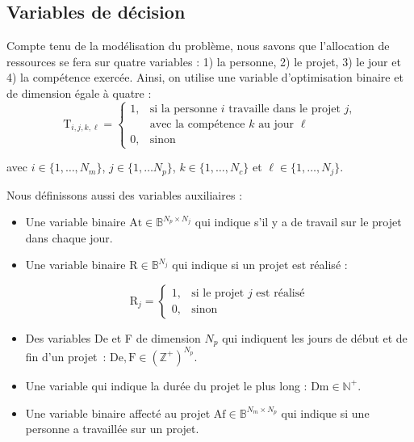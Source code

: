 \documentclass[12pt, a4paper, english, version=last, parskip=half, titlepage]{scrartcl}
\begin{document}
\subsection{Variables de décision}

Compte tenu de la modélisation du problème, nous savons que l'allocation de ressources se fera sur quatre variables : 1) la personne, 2) le projet, 3) le jour et 4) la compétence exercée. Ainsi, on utilise une variable d'optimisation binaire et de dimension égale à quatre :
\begin{equation*}
    \text{T}_{i,j,k,\ell} = 
    \begin{cases}
        1, & \text{si la personne $i$ travaille dans le projet $j$,} \\[-0.1em]
           & \text{avec la compétence $k$ au jour $\ell$} \\[0.2em]
        0, & \text{sinon}
    \end{cases}
\end{equation*}

avec $i \in \{1, \dots, N_m\}$, $j \in \{1, \dots N_p\}$, $k \in \{1, \dots, N_c\}$ et $\ell \in \{1, \dots, N_j\}$.

Nous définissons aussi des variables auxiliaires :

\begin{itemize}
    \item Une variable binaire $\text{At} \in \mathbb{B}^{N_p \times N_j}$ qui indique s'il y a de travail sur le projet dans chaque jour.
    \item Une variable binaire $\text{R} \in \mathbb{B}^{N_j}$ qui indique si un projet est réalisé :
    
        \begin{equation*}
            \text{R}_{j} = 
            \begin{cases}
                1, & \text{si le projet $j$ est réalisé} \\
                0, & \text{sinon}
            \end{cases}
        \end{equation*}
    \item Des variables De et F de dimension $N_p$ qui indiquent les jours de début et de fin d'un projet~: $\text{De},\text{F} \in \mathbb{(Z^{+})}^{N_p}$.
    \item Une variable qui indique la durée du projet le plus long : $\text{Dm} \in \mathbb{N}^+$.
    \item Une variable binaire affecté au projet $\text{Af} \in \mathbb{B}^{N_m \times N_p}$ qui indique si une personne a travaillée sur un projet.
\end{itemize}
\end{document}
